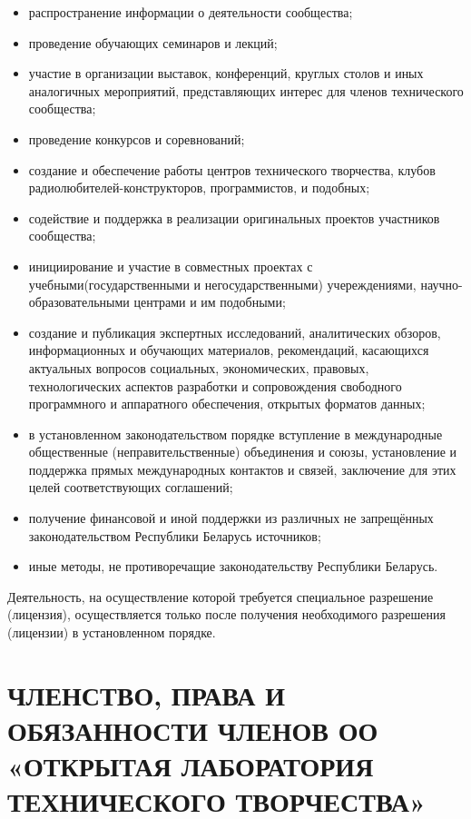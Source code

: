 \documentclass[a4paper,fontsize=14pt,titlepage]{scrartcl}
\makeatletter
\let\@@@section=\section
\renewcommand\section[1]{\@@@section{\MakeUppercase{#1}}}
\makeatother
\begin{document}
\begin{itemize}
\item распространение информации о деятельности сообщества;
\item проведение обучающих семинаров и лекций;
\item участие в организации выставок, конференций, круглых столов и иных аналогичных мероприятий, представляющих интерес для
членов технического сообщества;
\item проведение конкурсов и соревнований;
\item создание и обеспечение работы центров технического творчества, клубов радиолюбителей-конструкторов, программистов, и
подобных;
\item содействие и поддержка в реализации оригинальных проектов участников сообщества;
\item инициирование и участие в совместных проектах с учебными(государственными и негосударственными) учереждениями,
научно-образовательными центрами и им подобными;
\item создание и публикация экспертных исследований, аналитических обзоров,
информационных и обучающих материалов, рекомендаций, касающихся актуальных вопросов социальных,
экономических, правовых, технологических аспектов разработки и сопровождения свободного программного и аппаратного обеспечения,
открытых форматов данных;
\item в установленном законодательством порядке вступление в международные общественные (неправительственные) объединения и
союзы, установление и поддержка прямых международных контактов и связей, заключение для этих целей соответствующих
соглашений;
\item получение финансовой и иной поддержки из различных не запрещённых законодательством Республики Беларусь источников;
\item иные методы, не противоречащие законодательству Республики Беларусь.
\end{itemize}
Деятельность, на осуществление которой требуется специальное разрешение (лицензия),
осуществляется только после получения необходимого разрешения (лицензии) в установленном порядке.




\newpage\section{ЧЛЕНСТВО, ПРАВА И ОБЯЗАННОСТИ ЧЛЕНОВ ОО «Открытая лаборатория технического творчества»}
\end{document}
